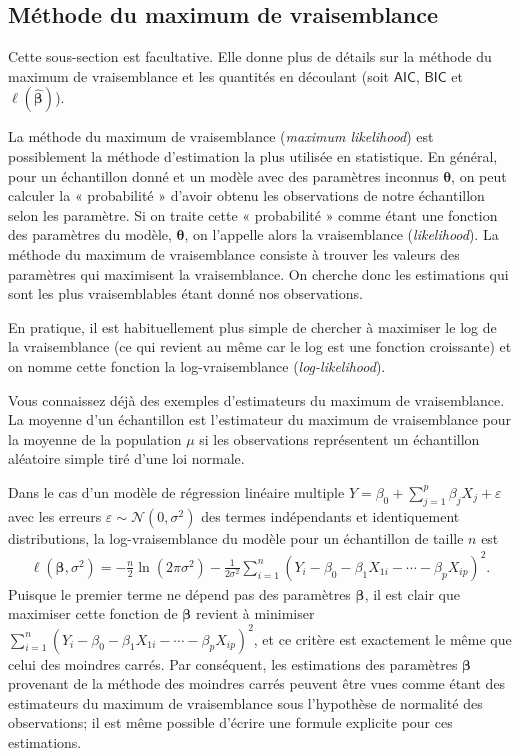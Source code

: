 \documentclass[
  11pt,
  letterpaper,
]{book}
\theoremstyle{definition}
\theoremstyle{definition}
\theoremstyle{definition}
\theoremstyle{remark}
\begin{document}
\hypertarget{muxe9thode-du-maximum-de-vraisemblance}{%
\subsection{Méthode du maximum de vraisemblance}\label{muxe9thode-du-maximum-de-vraisemblance}}

Cette sous-section est facultative. Elle donne plus de détails sur la méthode du maximum de vraisemblance et les quantités en découlant (soit \(\mathsf{AIC}\), \(\mathsf{BIC}\) et \(\ell(\widehat{\boldsymbol{\beta}})\)).

La méthode du maximum de vraisemblance (\emph{maximum likelihood}) est possiblement la méthode d'estimation la plus utilisée en statistique. En général, pour un échantillon donné et un modèle avec des paramètres inconnus \(\boldsymbol{\theta}\), on peut calculer la « probabilité » d'avoir obtenu les observations de notre échantillon selon les paramètre. Si on traite cette « probabilité » comme étant une fonction des paramètres du modèle, \(\boldsymbol{\theta}\), on l'appelle alors la vraisemblance (\emph{likelihood}). La méthode du maximum de vraisemblance consiste à trouver les valeurs des paramètres qui maximisent la vraisemblance. On cherche donc les estimations qui sont les plus vraisemblables étant donné nos observations.

En pratique, il est habituellement plus simple de chercher à maximiser le log de la vraisemblance (ce qui revient au même car le log est une fonction croissante) et on nomme cette fonction la log-vraisemblance (\emph{log-likelihood}).

Vous connaissez déjà des exemples d'estimateurs du maximum de vraisemblance. La moyenne d'un échantillon est l'estimateur du maximum de vraisemblance pour la moyenne de la population \(\mu\) si les observations représentent un échantillon aléatoire simple tiré d'une loi normale.

Dans le cas d'un modèle de régression linéaire multiple \(Y = \beta_0 + \sum_{j=1}^p \beta_jX_j + \varepsilon\) avec les erreurs \(\varepsilon\sim \mathcal{N}(0, \sigma^2)\) des termes indépendants et identiquement distributions, la log-vraisemblance du modèle pour un échantillon de taille \(n\) est
\begin{align*}
 \ell(\boldsymbol{\beta}, \sigma^2) =- \frac{n}{2} \ln(2\pi\sigma^2) - \frac{1}{2\sigma^2}\sum_{i=1}^n (Y_i- \beta_0 - \beta_1 X_{1i} - \cdots - \beta_pX_{ip})^2.
\end{align*}
Puisque le premier terme ne dépend pas des paramètres \(\boldsymbol{\beta}\), il est clair que maximiser cette fonction de \(\boldsymbol{\beta}\) revient à minimiser \(\sum_{i=1}^n (Y_i- \beta_0 - \beta_1 X_{1i} - \cdots - \beta_pX_{ip})^2\), et ce critère est exactement le même que celui des moindres carrés. Par conséquent, les estimations des paramètres \(\boldsymbol{\beta}\) provenant de la méthode des moindres carrés peuvent être vues comme étant des estimateurs du maximum de vraisemblance sous l'hypothèse de normalité des observations; il est même possible d'écrire une formule explicite pour ces estimations.
\end{document}
